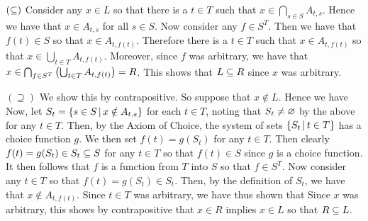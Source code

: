 {{    $(\ss)$ Consider any $x \in L$ so that there is a $t \in T$ such that $x \in \bigcap_{s \in S} A_{t,s}$.
    Hence we have that $x \in A_{t,s}$ for all $s \in S$.
    Now consider any $f \in S^T$.
    Then we have that $f(t) \in S$ so that $x \in A_{t,f(t)}$.
    Therefore there is a $t \in T$ such that $x \in A_{t,f(t)}$ so that $x \in \bigcup_{t \in T} A_{t,f(t)}$.
    Moreover, since $f$ was arbitrary, we have that $x \in \SR = R$.
    This shows that $L \ss R$ since $x$ was arbitrary.

    $(\supseteq)$ We show this by contrapositive.
    So suppose that $x \notin L$.
    Hence we have
    Now, let $S_t = \braces{s \in S \where x \notin A_{t,s}}$ for each $t \in T$, noting that $S_t \neq \es$ by the above for any $t \in T$.
    Then, by the Axiom of Choice, the system of sets $\braces{S_t \where t \in T}$ has a choice function $g$.
    We then set $f(t) = g(S_t)$ for any $t \in T$.
    Then clearly $f(t) = g(S_t) \in S_t \ss S$ for any $t \in T$ so that $f(t) \in S$ since $g$ is a choice function.
    It then follows that $f$ is a function from $T$ into $S$ so that $f \in S^T$.
    Now consider any $t \in T$ so that $f(t) = g(S_t) \in S_t$.
    Then, by the definition of $S_t$, we have that $x \notin A_{t,f(t)}$.
    Since $t \in T$ was arbitrary, we have thus shown that
    Since $x$ was arbitrary, this shows by contrapositive that $x \in R$ implies $x \in L$ so that $R \ss L$.
  }
}

